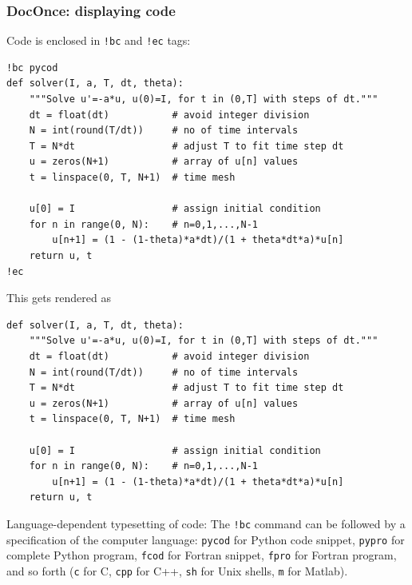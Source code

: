 \documentclass{beamer}
\begin{document}
\begin{frame}
\frametitle{DocOnce: displaying code}

Code is enclosed in \Verb?!bc? and \Verb?!ec? tags:
\begin{Verbatim}[numbers=none,fontsize=\fontsize{9pt}{9pt},baselinestretch=0.95]
!bc pycod
def solver(I, a, T, dt, theta):
    """Solve u'=-a*u, u(0)=I, for t in (0,T] with steps of dt."""
    dt = float(dt)           # avoid integer division
    N = int(round(T/dt))     # no of time intervals
    T = N*dt                 # adjust T to fit time step dt
    u = zeros(N+1)           # array of u[n] values
    t = linspace(0, T, N+1)  # time mesh

    u[0] = I                 # assign initial condition
    for n in range(0, N):    # n=0,1,...,N-1
        u[n+1] = (1 - (1-theta)*a*dt)/(1 + theta*dt*a)*u[n]
    return u, t
!ec

\end{Verbatim}

This gets rendered as
\begin{verbatim}
def solver(I, a, T, dt, theta):
    """Solve u'=-a*u, u(0)=I, for t in (0,T] with steps of dt."""
    dt = float(dt)           # avoid integer division
    N = int(round(T/dt))     # no of time intervals
    T = N*dt                 # adjust T to fit time step dt
    u = zeros(N+1)           # array of u[n] values
    t = linspace(0, T, N+1)  # time mesh

    u[0] = I                 # assign initial condition
    for n in range(0, N):    # n=0,1,...,N-1
        u[n+1] = (1 - (1-theta)*a*dt)/(1 + theta*dt*a)*u[n]
    return u, t

\end{verbatim}

\begin{block}{Language-dependent typesetting of code: }
The \Verb?!bc? command can be followed by a specification of the computer
language: \texttt{pycod} for Python code snippet, \texttt{pypro} for complete Python
program, \texttt{fcod} for Fortran snippet, \texttt{fpro} for Fortran program, and so
forth (\texttt{c} for C, \texttt{cpp} for C++, \texttt{sh} for Unix shells, \texttt{m} for Matlab).
\end{block}
\end{frame}
\end{document}
